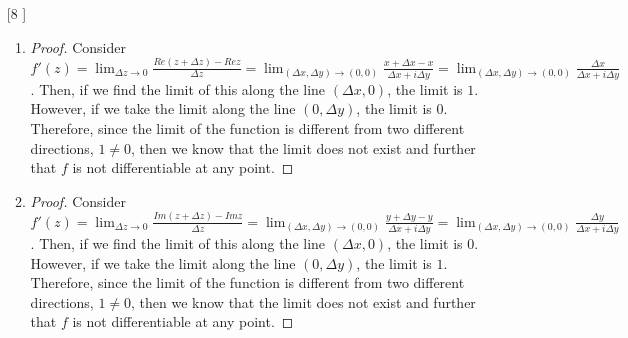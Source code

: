 \documentclass{article}
\theoremstyle{definition}
\begin{document}
\begin{enumerate}
\begin{enumerate}
        \item
        
        \begin{proof}
        We will proceed by mathematical induction:\\
        Base Case: If we consider the case when $m = 0$ then we have that $P(0) = a_0 + a_1(0) + ... + a_n(0)^n = a_0$ as desired. Therefore, the statement is verified for $m = 0$.\\
        Inductive Step: Assume that the statement is true for $m = k$, we then want to show that the statement is true for $m = k + 1$. Then we know that $\frac{d}{dz}P^{k + 1}(z) = \frac{d}{dz}(P^{(k)}(z)) = \frac{d}{dz}(\frac{k!}{0!}a_{k+1} + \frac{(k+1)!}{1!}a_{k+1}z + ... + \frac{n!}{(n-k)!}z^{n-k}) = 0 + \frac{(k+1)!}{0!}a_{k+1} + ... + \frac{n!}{(n-k+1)!}z^{n-k+1}$. Therefore, we see that $P^{(k)}(0) = k!a_k$ implies then that $a_k = \frac{P^{(k)}(0)}{k!}$ as desired.
        \end{proof}
        
    \end{enumerate}
    
    \item [[\phantom{-}8]]
    
    \begin{enumerate}
        \item 
        
        \begin{proof}
        Consider $f'(z) = \lim_{\Delta z\to 0} \frac{Re(z + \Delta z) - Re z}{\Delta z} = \lim_{(\Delta x, \Delta y) \to (0 , 0)} \frac{x + \Delta x - x}{\Delta x + i\Delta y} = \lim_{(\Delta x, \Delta y) \to (0, 0)}\frac{\Delta x}{\Delta x + i \Delta y}$. Then, if we find the limit of this along the line $(\Delta x, 0)$, the limit is $1.$ However, if we take the limit along the line $(0, \Delta y)$, the limit is $0.$ Therefore, since the limit of the function is different from two different directions, $1 \neq 0$, then we know that the limit does not exist and further that $f$ is not differentiable at any point.
        \end{proof}
        
        \item
        
        \begin{proof}
        Consider $f'(z) = \lim_{\Delta z\to 0} \frac{Im(z + \Delta z) - Im z}{\Delta z} = \lim_{(\Delta x, \Delta y) \to (0 , 0)} \frac{y + \Delta y - y}{\Delta x + i\Delta y} = \lim_{(\Delta x, \Delta y) \to (0, 0)}\frac{\Delta y}{\Delta x + i \Delta y}$. Then, if we find the limit of this along the line $(\Delta x, 0)$, the limit is $0.$ However, if we take the limit along the line $(0, \Delta y)$, the limit is $1.$ Therefore, since the limit of the function is different from two different directions, $1 \neq 0$, then we know that the limit does not exist and further that $f$ is not differentiable at any point.
        \end{proof}
        

\end{enumerate}
\end{enumerate}
\end{document}
